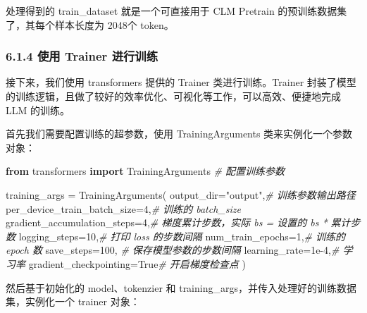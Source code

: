 \documentclass[
]{article}
\newenvironment{Shaded}{}{}
\newcommand{\CommentTok}[1]{\textcolor[rgb]{0.38,0.63,0.69}{\textit{#1}}}
\newcommand{\DecValTok}[1]{\textcolor[rgb]{0.25,0.63,0.44}{#1}}
\newcommand{\FloatTok}[1]{\textcolor[rgb]{0.25,0.63,0.44}{#1}}
\newcommand{\ImportTok}[1]{\textcolor[rgb]{0.00,0.50,0.00}{\textbf{#1}}}
\newcommand{\NormalTok}[1]{#1}
\newcommand{\OperatorTok}[1]{\textcolor[rgb]{0.40,0.40,0.40}{#1}}
\newcommand{\StringTok}[1]{\textcolor[rgb]{0.25,0.44,0.63}{#1}}
\newcommand{\VariableTok}[1]{\textcolor[rgb]{0.10,0.09,0.49}{#1}}
\begin{document}
处理得到的 train\_dataset 就是一个可直接用于 CLM Pretrain
的预训练数据集了，其每个样本长度为 2048个 token。

\subsubsection{6.1.4 使用 Trainer
进行训练}\label{ux4f7fux7528-trainer-ux8fdbux884cux8badux7ec3}

接下来，我们使用 transformers 提供的 Trainer 类进行训练。Trainer
封装了模型的训练逻辑，且做了较好的效率优化、可视化等工作，可以高效、便捷地完成
LLM 的训练。

首先我们需要配置训练的超参数，使用 TrainingArguments
类来实例化一个参数对象：

\begin{Shaded}
\begin{Highlighting}[]
\ImportTok{from}\NormalTok{ transformers }\ImportTok{import}\NormalTok{ TrainingArguments}
\CommentTok{\# 配置训练参数}

\NormalTok{training\_args }\OperatorTok{=}\NormalTok{ TrainingArguments(}
\NormalTok{    output\_dir}\OperatorTok{=}\StringTok{"output"}\NormalTok{,}\CommentTok{\# 训练参数输出路径}
\NormalTok{    per\_device\_train\_batch\_size}\OperatorTok{=}\DecValTok{4}\NormalTok{,}\CommentTok{\# 训练的 batch\_size}
\NormalTok{    gradient\_accumulation\_steps}\OperatorTok{=}\DecValTok{4}\NormalTok{,}\CommentTok{\# 梯度累计步数，实际 bs = 设置的 bs * 累计步数}
\NormalTok{    logging\_steps}\OperatorTok{=}\DecValTok{10}\NormalTok{,}\CommentTok{\# 打印 loss 的步数间隔}
\NormalTok{    num\_train\_epochs}\OperatorTok{=}\DecValTok{1}\NormalTok{,}\CommentTok{\# 训练的 epoch 数}
\NormalTok{    save\_steps}\OperatorTok{=}\DecValTok{100}\NormalTok{, }\CommentTok{\# 保存模型参数的步数间隔}
\NormalTok{    learning\_rate}\OperatorTok{=}\FloatTok{1e{-}4}\NormalTok{,}\CommentTok{\# 学习率}
\NormalTok{    gradient\_checkpointing}\OperatorTok{=}\VariableTok{True}\CommentTok{\# 开启梯度检查点}
\NormalTok{)}
\end{Highlighting}
\end{Shaded}

然后基于初始化的 model、tokenzier 和
training\_args，并传入处理好的训练数据集，实例化一个 trainer 对象：
\end{document}
